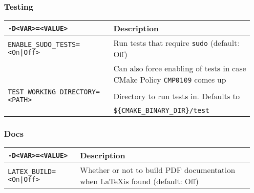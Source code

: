 \subsubsection{Testing}
\begin{table}[H]
\centering
\begin{tabularx}{1.2\textwidth}{| l | X |}
  \hline
  \texttt{-D<VAR>=<VALUE>} & Description \\
  \hline
  \texttt{ENABLE\_SUDO\_TESTS=<On|Off>}
  & Run tests that require \texttt{sudo} (default: Off) \\
  & Can also force enabling of tests in case CMake Policy
  \texttt{CMP0109} comes up \\
  \hline
  \texttt{TEST\_WORKING\_DIRECTORY=<PATH>}
  & Directory to run tests in. Defaults to \\
  & \texttt{\$\{CMAKE\_BINARY\_DIR\}/test} \\
  \hline
\end{tabularx}
\end{table}

\subsubsection{Docs}
\begin{table}[H]
\centering
\begin{tabularx}{1.2\textwidth}{| l | X |}
  \hline
  \texttt{-D<VAR>=<VALUE>} & Description \\
  \hline
  \texttt{LATEX\_BUILD=<On|Off>}
  & Whether or not to build PDF documentation when \LaTeX is found
  (default: Off) \\
  \hline
\end{tabularx}
\end{table}

